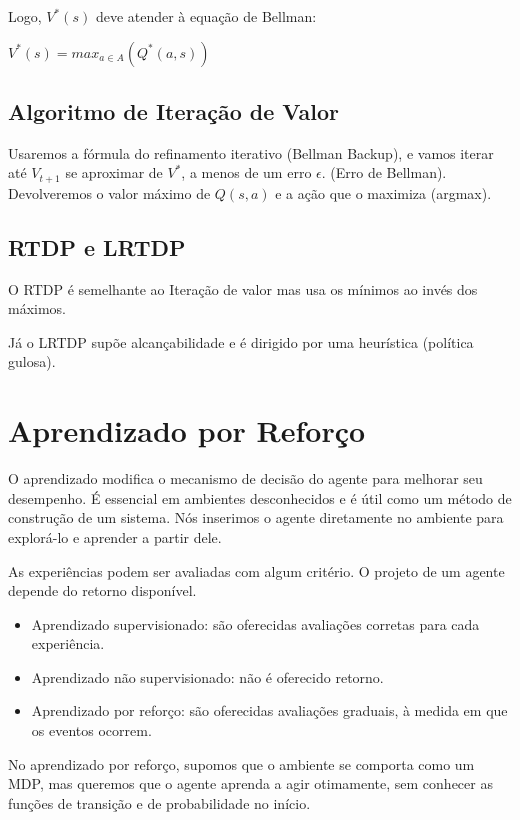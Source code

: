 \documentclass[12pt,letterpaper]{article}
\begin{document}
	Logo, $V^*(s)$ deve atender à equação de Bellman:
	
	\begin{center}
		$V^*(s) = max_{a \in A} (Q^*(a, s))$
	\end{center}
	
	\subsection*{Algoritmo de Iteração de Valor} 
	
	Usaremos a fórmula do refinamento iterativo (Bellman Backup), e vamos iterar até  $V_{t+1}$ se aproximar de $V^*$, a menos de um erro $\epsilon$. (Erro de Bellman). Devolveremos o valor máximo de $Q(s,a)$ e a ação que o maximiza (argmax).
	
	\subsection*{RTDP e LRTDP}
	
	O RTDP é semelhante ao Iteração de valor mas usa os mínimos ao invés dos máximos.
	
	Já o LRTDP supõe alcançabilidade e é dirigido por uma heurística (política gulosa).
	
	\section*{Aprendizado por Reforço}
	
	O aprendizado modifica o mecanismo de decisão do agente para melhorar seu desempenho. É essencial em ambientes desconhecidos e é útil como um método de construção de um sistema. Nós inserimos o agente diretamente no ambiente para explorá-lo e aprender a partir dele.
	
	As experiências podem ser avaliadas com algum critério. O projeto de um agente depende do retorno disponível.
	
	\begin{itemize}
		\item Aprendizado supervisionado: são oferecidas avaliações corretas para cada experiência.
		\item Aprendizado não supervisionado: não é oferecido retorno.
		\item Aprendizado por reforço: são oferecidas avaliações graduais, à medida em que os eventos ocorrem.
	\end{itemize}
	
	No aprendizado por reforço, supomos que o ambiente se comporta como um MDP, mas queremos que o agente aprenda a agir otimamente, sem conhecer as funções de transição e de probabilidade no início.
	
\end{document}
